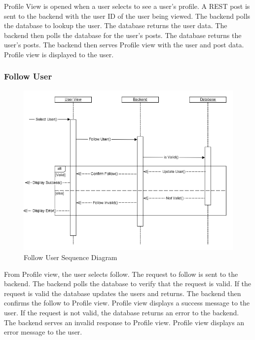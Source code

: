             Profile View is opened when a user selects to see a user’s profile.
            A REST post is sent to the backend with the user ID of the user
            being viewed. The backend polls the database to lookup the user. The
            database returns the user data. The backend then polls the database
            for the user’s posts. The database returns the user’s posts. The
            backend then serves Profile view with the user and post data.
            Profile view is displayed to the user. 

        \subsubsection{Follow User}
            \begin{figure}[H]
                \centering
                \includegraphics[width=\textwidth]{src/img/follow-user.png}
                \caption{Follow User Sequence Diagram} 
            \end{figure}

            From Profile view, the user selects follow. The request to follow is
            sent to the backend. The backend polls the database to verify that
            the request is valid. If the request is valid the database updates
            the users and returns. The backend then confirms the follow to
            Profile view. Profile view displays a success message to the user.
            If the request is not valid, the database returns an error to the
            backend. The backend serves an invalid response to Profile view.
            Profile view displays an error message to the user. 

